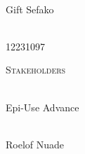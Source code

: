 \begin{titlepage}
\begin{center}
		
		\begin{minipage}{0.4\textwidth}
			\begin{flushleft} \large
				\emph{} \\
				Gift {Sefako }
			\end{flushleft}
		\end{minipage}
		\begin{minipage}{0.4\textwidth}
			\begin{flushright} \large
				\emph{} \\
				12231097
			\end{flushright}
		\end{minipage}
		
		\textsc{\Large Stakeholders}\\[1cm]	
				
		\begin{minipage}{0.4\textwidth}
			\begin{flushleft} \large
				\emph{} \\
				Epi-Use Advance
			\end{flushleft}
		\end{minipage}
		\begin{minipage}{0.4\textwidth}
			\begin{flushright} \large
				\emph{} \\
				Roelof Nuade
			\end{flushright}
		\end{minipage}
		
	\end{center}
\end{titlepage}